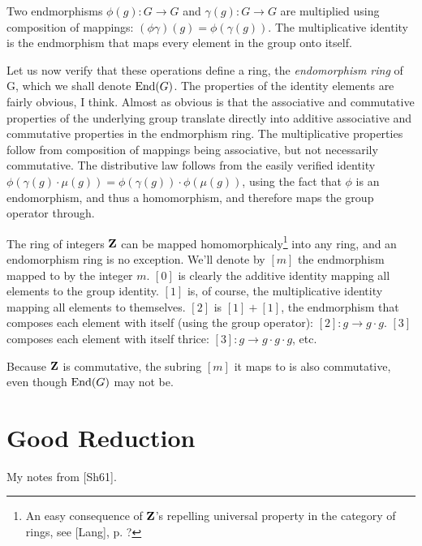 Two endmorphisms $\phi(g): G \to G$ and $\gamma(g): G \to G$ are
multiplied using composition of mappings: $(\phi\gamma)(g) =
\phi(\gamma(g))$.  The multiplicative identity is the endmorphism that
maps every element in the group onto itself.

Let us now verify that these operations define a ring, the {\it endomorphism
ring} of G, which we shall denote ${\rm End}(G)$.  The properties
of the identity elements are fairly obvious, I think.  Almost as
obvious is that the associative and commutative properties of the
underlying group translate directly into additive associative and
commutative properties in the endmorphism ring.  The multiplicative
properties follow from composition of mappings being associative, but
not necessarily commutative.  The distributive law follows from the
easily verified identity $\phi(\gamma(g)\cdot\mu(g)) = \phi(\gamma(g)) \cdot
\phi(\mu(g))$, using the fact that $\phi$ is an endomorphism, and thus
a homomorphism, and therefore maps the group operator through.

The ring of integers ${\bf Z}$ can be mapped homomorphicaly\footnote{An easy
consequence of ${\bf Z}$'s repelling universal property in the category of
rings, see [Lang], p. ?} into any ring, and an endomorphism ring is no
exception.  We'll denote by $[m]$ the endmorphism mapped to by the
integer $m$. $[0]$ is clearly the additive identity mapping all
elements to the group identity.  $[1]$ is, of course, the
multiplicative identity mapping all elements to themselves.  $[2]$ is
$[1]+[1]$, the endmorphism that composes each element with itself
(using the group operator): $[2]: g \to g\cdot g$.  $[3]$ composes
each element with itself thrice: $[3]: g \to g\cdot g\cdot g$, etc.

Because ${\bf Z}$ is commutative, the subring $[m]$ it maps to is also
commutative, even though ${\rm End}(G)$ may not be.



\section{Good Reduction}

My notes from [Sh61].

